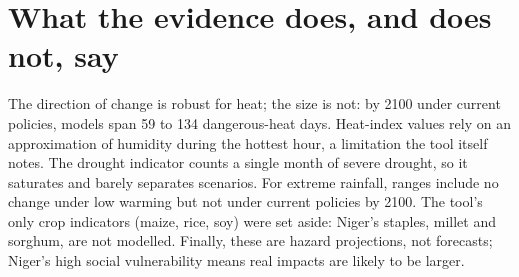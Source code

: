 \documentclass[10pt,a4paper]{article}
\begin{document}
\section{What the evidence does, and does not, say}
{\small
The direction of change is robust for heat; the size is not: by 2100 under current policies, models span 59 to
134 dangerous-heat days. Heat-index values rely on an approximation of humidity during the hottest hour, a
limitation the tool itself notes. The drought indicator counts a single month of severe drought, so it saturates
and barely separates scenarios. For extreme rainfall, ranges include no change under low warming but not
under current policies by 2100. The tool's only crop indicators (maize, rice, soy) were set aside: Niger's
staples, millet and sorghum, are not modelled. Finally, these are hazard projections, not forecasts; Niger's
high social vulnerability means real impacts are likely to be larger.\par}

\clearpage
\end{document}
